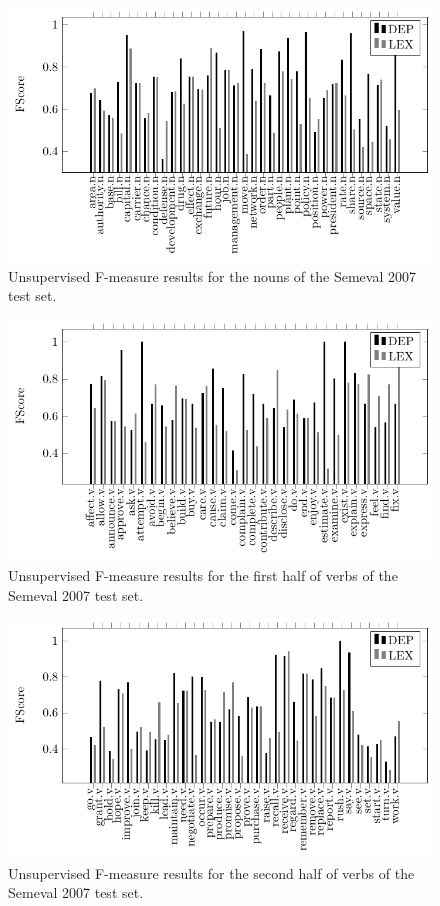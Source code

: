  \begin{figure}[!htb]
\centering
\includegraphics[width=1\linewidth]{images/Chapitre5/tex_img_files/nouns_fs.pdf}
\caption{Unsupervised F-measure results for the nouns of the Semeval 2007 test set.}
\label{fig:nouns_fs}
\end{figure}

 \begin{figure}[!htb]
\centering
\includegraphics[width=1\linewidth]{images/Chapitre5/tex_img_files/verbs_fs_2.pdf}
\caption{Unsupervised F-measure results for the first half of verbs of the Semeval 2007 test set.}
\label{fig:verbs_fs2}
\end{figure}

 \begin{figure}[!htb]
\centering
\includegraphics[width=1\linewidth]{images/Chapitre5/tex_img_files/verbs_fs_3.pdf}
\caption{Unsupervised F-measure results for the second half of verbs of the Semeval 2007 test set.}
\label{fig:verbs_fs3}
\end{figure}


